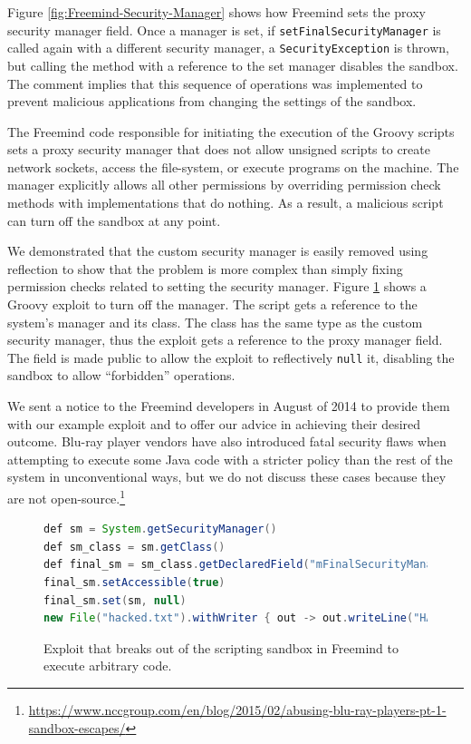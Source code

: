 \documentclass{sig-alternate}
\begin{document}
Figure \ref{fig:Freemind-Security-Manager} shows how Freemind sets
the proxy security manager field.
Once a manager is set, if \texttt{setFinalSecurityManager} is called
again with a different security manager, a \texttt{SecurityException}
is thrown, but calling the method with a reference to the set manager disables
the sandbox. The comment implies that this sequence
of operations was implemented to prevent malicious applications from
changing the settings of the sandbox.

The Freemind code responsible for initiating the execution of the
Groovy scripts sets a proxy security manager that does not allow unsigned
scripts to create network sockets, access the file-system, or execute
programs on the machine. The manager explicitly allows all other permissions by overriding permission check methods with implementations that do nothing. As a result, a malicious script can turn off the sandbox at any point.

We demonstrated that the custom security manager is easily removed
using reflection to show that the problem is more complex than simply
fixing permission checks related to setting the security manager. Figure \ref{fig:Example-Exploit-for-Freemind}
shows a Groovy exploit to turn off the manager. The script gets a reference to the system's manager
and its class. The class has the same type as the custom security
manager, thus the exploit gets a reference to the proxy manager field.
The field is made public to allow the exploit to reflectively \texttt{null}
it, disabling the sandbox to allow ``forbidden'' operations.

We sent a notice to the Freemind developers in August of 2014 to provide
them with our example exploit and to offer our advice in achieving
their desired outcome. Blu-ray player vendors have also introduced fatal security flaws when attempting to execute some Java code with a stricter policy than the rest of the system in unconventional ways, but we do not discuss these cases because they are not open-source.\footnote{\url{https://www.nccgroup.com/en/blog/2015/02/abusing-blu-ray-players-pt-1-sandbox-escapes/}}

\begin{figure}
\begin{lstlisting}[language=Java,basicstyle={\scriptsize},breaklines=true]
def sm = System.getSecurityManager() 
def sm_class = sm.getClass() 
def final_sm = sm_class.getDeclaredField("mFinalSecurityManager")
final_sm.setAccessible(true) 
final_sm.set(sm, null)
new File("hacked.txt").withWriter { out -> out.writeLine("HACKED!") }
\end{lstlisting}
\caption{Exploit that breaks out of the scripting sandbox in Freemind\label{fig:Example-Exploit-for-Freemind}
to execute arbitrary code.}
\end{figure}
\end{document}

